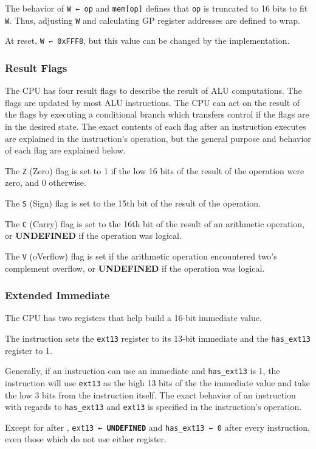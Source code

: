 \documentclass[12pt,a4paper]{article}
\newcommand{\undefined}{\textbf{UNDEFINED}}
\begin{document}
The behavior of \texttt{W ← op} and \texttt{mem[op]} defines that \texttt{op} is truncated to 16 bits to fit \texttt{W}. Thus, adjusting \texttt{W} and calculating GP register addresses are defined to wrap.

At reset, \texttt{W ← 0xFFF8}, but this value can be changed by the implementation.

\subsubsection{Result Flags}
The CPU has four result flags to describe the result of ALU computations. The flags are updated by most ALU instructions. The CPU can act on the result of the flags by executing a conditional branch which transfers control if the flags are in the desired state. The exact contents of each flag after an instruction executes are explained in the instruction's operation, but the general purpose and behavior of each flag are explained below.

The \texttt{Z} (Zero) flag is set to 1 if the low 16 bits of the result of the operation were zero, and 0 otherwise.

The \texttt{S} (Sign) flag is set to the 15th bit of the result of the operation.

The \texttt{C} (Carry) flag is set to the 16th bit of the result of an arithmetic operation, or \undefined{} if the operation was logical.

The \texttt{V} (oVerflow) flag is set if the arithmetic operation encountered two's complement overflow, or \undefined{} if the operation was logical.

\subsubsection{Extended Immediate}
The CPU has two registers that help build a 16-bit immediate value.

The  instruction sets the \texttt{ext13} register to its 13-bit immediate and the \texttt{has\_ext13} register to 1.

Generally, if an instruction can use an immediate and \texttt{has\_ext13} is 1, the instruction will use \texttt{ext13} as the high 13 bits of the the immediate value and take the low 3 bits from the instruction itself. The exact behavior of an instruction with regards to \texttt{has\_ext13} and \texttt{ext13} is specified in the instruction's operation.

Except for after , \texttt{ext13 ← \undefined{}} and \texttt{has\_ext13 ← 0} after every instruction, even those which do not use either register.
\end{document}
